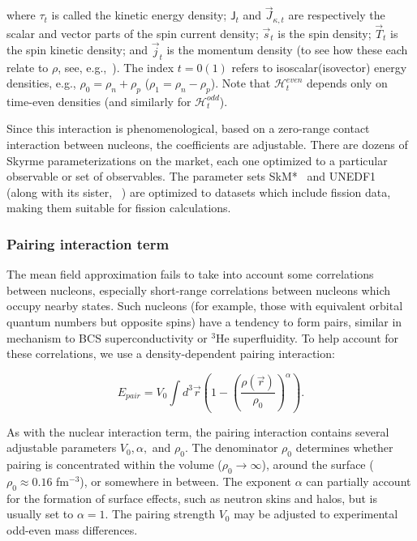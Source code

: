 \noindent where $\tau_t$ is called the kinetic energy density; $\mathsf{J}_t$ and $\vec{J}_{\kappa,t}$ are respectively the scalar and vector parts of the spin current density; $\vec{s}_t$ is the spin density; $\vec{T}_t$ is the spin kinetic density; and $\vec{j}_t$ is the momentum density (to see how these each relate to $\rho$, see, e.g.,~\cite{bender2003}). The index $t=0(1)$ refers to isoscalar(isovector) energy densities, e.g., $\rho_0 = \rho_n + \rho_p$ ($\rho_1 = \rho_n - \rho_p$). Note that $\mathcal{H}^{even}_t$ depends only on time-even densities (and similarly for $\mathcal{H}^{odd}_t$).

Since this interaction is phenomenological, based on a zero-range contact interaction between nucleons, the coefficients are adjustable. There are dozens of Skyrme parameterizations on the market, each one optimized to a particular observable or set of observables. The parameter sets SkM*~\cite{Bartel1982} and UNEDF1~\cite{Kortelainen2012} (along with its sister, {\hfb}~\cite{Schunck2015}) are optimized to datasets which include fission data, making them suitable for fission calculations.

\subsubsection{Pairing interaction term}
The mean field approximation fails to take into account some correlations between nucleons, especially short-range correlations between nucleons which occupy nearby states. Such nucleons (for example, those with equivalent orbital quantum numbers but opposite spins) have a tendency to form pairs, similar in mechanism to BCS superconductivity or $^3$He superfluidity. To help account for these correlations, we use a density-dependent pairing interaction:

\begin{equation}
E_{pair} = V_0 \int d^3\vec{r} \left( 1-\left(\frac{\rho(\vec{r})}{\rho_0}\right)^\alpha \right).
\end{equation}

\noindent As with the nuclear interaction term, the pairing interaction contains several adjustable parameters $V_0, \alpha,$ and $\rho_0$. The denominator $\rho_0$ determines whether pairing is concentrated within the volume ($\rho_0\rightarrow\infty$), around the surface ($\rho_0\approx0.16$ fm$^{-3}$), or somewhere in between. The exponent $\alpha$ can partially account for the formation of surface effects, such as neutron skins and halos, but is usually set to $\alpha=1$. The pairing strength $V_0$ may be adjusted to experimental odd-even mass differences.

